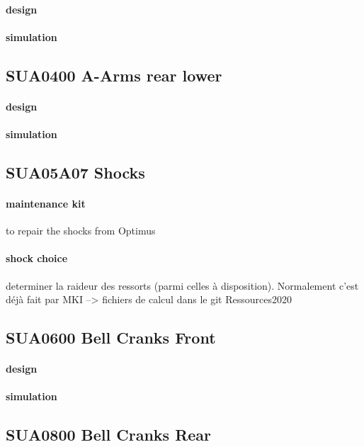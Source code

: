 		\paragraph{design} 
		\paragraph{simulation} 
	\subsection*{SU\textunderscore A0400 A-Arms rear lower} 
 \par 
		\paragraph{design} 
		\paragraph{simulation} 
	\subsection*{SU\textunderscore A05A07 Shocks} 
 \par 
		\paragraph{maintenance kit} to repair the shocks from Optimus
		\paragraph{shock choice} determiner la raideur des ressorts (parmi celles à disposition). Normalement c'est déjà fait par MKI --> fichiers de calcul dans le git Ressources2020 
	\subsection*{SU\textunderscore A0600 Bell Cranks Front} 
 \par 
		\paragraph{design} 
		\paragraph{simulation} 
	\subsection*{SU\textunderscore A0800 Bell Cranks Rear} 
 \par 
